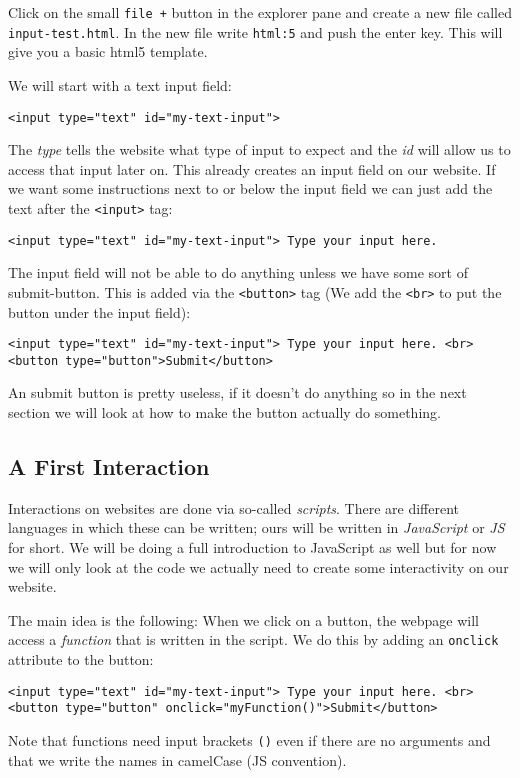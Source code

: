 \documentclass[11pt,a4paper]{report}
\begin{document}
Click on the small \verb|file +| button in the explorer pane and create a new file called \verb|input-test.html|. In the new file write \verb|html:5| and push the enter key. This will give you a basic html5 template.

We will start with a text input field: 
\begin{verbatim}
<input type="text" id="my-text-input">
\end{verbatim}
The \emph{type} tells the website what type of input to expect and the \emph{id} will allow us to access that input later on. This already creates an input field on our website. If we want some instructions next to or below the input field we can just add the text after the \verb|<input>| tag:
\begin{verbatim}
<input type="text" id="my-text-input"> Type your input here.
\end{verbatim}

The input field will not be able to do anything unless we have some sort of submit-button. This is added via the \verb|<button>| tag (We add the \verb|<br>| to put the button under the input field): 
\begin{verbatim}
<input type="text" id="my-text-input"> Type your input here. <br>
<button type="button">Submit</button>
\end{verbatim}

An submit button is pretty useless, if it doesn't do anything so in the next section we will look at how to make the button actually do something.

\subsection{A First Interaction}

Interactions on websites are done via so-called \emph{scripts}. There are different languages in which these can be written; ours will be written in \emph{JavaScript} or \emph{JS} for short.  We will be doing a full introduction to JavaScript as well but for now we will only look at the code we actually need to create some interactivity on our website.

The main idea is the following: When we click on a button, the webpage will access a \emph{function} that is written in the script.  We do this by adding an \verb|onclick| attribute to the button: 
\begin{verbatim}
<input type="text" id="my-text-input"> Type your input here. <br>
<button type="button" onclick="myFunction()">Submit</button>
\end{verbatim}
Note that functions need input brackets \verb|()| even if there are no arguments and that we write the names in camelCase (JS convention).
\end{document}
